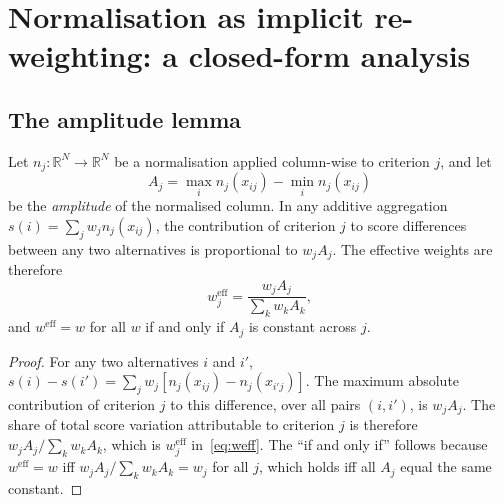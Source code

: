 
\section{Normalisation as implicit re-weighting: a closed-form analysis}
\label{sec:propositions}

\subsection{The amplitude lemma}
\label{sec:amplitude}

\begin{lemma}
\label{lem:amplitude}
Let $n_j : \mathbb{R}^N \to \mathbb{R}^N$ be a normalisation applied
column-wise to criterion $j$, and let
\begin{equation}
  A_j = \max_i n_j(x_{ij}) - \min_i n_j(x_{ij})
\end{equation}
be the \emph{amplitude} of the normalised column.
In any additive aggregation $s(i) = \sum_j w_j n_j(x_{ij})$, the
contribution of criterion $j$ to score differences between any two
alternatives is proportional to $w_j A_j$.
The effective weights are therefore
\begin{equation}
  \label{eq:weff}
  w_j^{\mathrm{eff}} = \frac{w_j A_j}{\sum_k w_k A_k},
\end{equation}
and $w^{\mathrm{eff}} = w$ for all $w$ if and only if $A_j$ is constant
across $j$.
\end{lemma}

\begin{proof}
For any two alternatives $i$ and $i'$,
$s(i) - s(i') = \sum_j w_j [n_j(x_{ij}) - n_j(x_{i'j})]$.
The maximum absolute contribution of criterion $j$ to this difference,
over all pairs $(i,i')$, is $w_j A_j$.
The share of total score variation attributable to criterion $j$ is
therefore $w_j A_j / \sum_k w_k A_k$, which is $w_j^{\mathrm{eff}}$
in~\eqref{eq:weff}.
The ``if and only if'' follows because $w^{\mathrm{eff}} = w$ iff
$w_j A_j / \sum_k w_k A_k = w_j$ for all $j$, which holds iff all
$A_j$ equal the same constant.
\end{proof}

